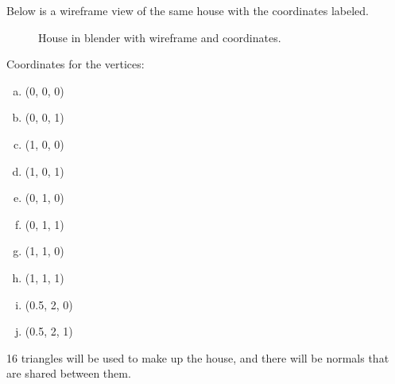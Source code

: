 \documentclass[10pt]{report}
\begin{document}
Below is a wireframe view of the same house with the coordinates labeled.
\begin{figure}[h]
    \centering
    \caption{House in blender with wireframe and coordinates.}
\end{figure}

Coordinates for the vertices:
\begin{enumerate}[(a)]
    \item (0, 0, 0)
    \item (0, 0, 1)
    \item (1, 0, 0)
    \item (1, 0, 1)
    \item (0, 1, 0)
    \item (0, 1, 1)
    \item (1, 1, 0)
    \item (1, 1, 1)
    \item (0.5, 2, 0)
    \item (0.5, 2, 1)
\end{enumerate}

16 triangles will be used to make up the house, and there will be normals that are shared between them.







\end{document}
